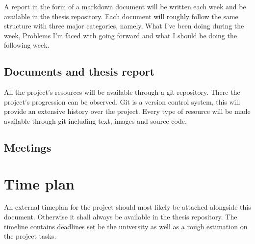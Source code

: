\documentclass[10pt, titlepage, oneside, a4paper]{article}
\begin{document}
A report in the form of a markdown document will be written each week and be available in the thesis repository\cite{repository:me:thesis}. Each document will roughly follow the same structure with three major categories, namely, What I've been doing during the week, Problems I'm faced with going forward and what I should be doing the following week.

\subsection{Documents and thesis report}

All the project's resources will be available through a git repository\cite{repository:me:thesis}. There the project's progression can be observed. Git is a version control system, this will provide an extensive history over the project. Every type of resource will be made available through git including text, images and source code. 

\subsection{Meetings}

\section{Time plan}

An external timeplan for the project should most likely be attached alongside this document. Otherwise it shall always be available in the thesis repository\cite{repository:me:thesis}. The timeline contains deadlines set be the university as well as a rough estimation on the project tasks.






\end{document}
